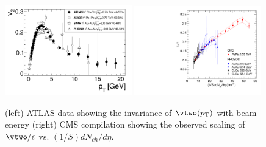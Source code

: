 \begin{figure}[!htb]
\begin{center}
\includegraphics[width=0.49\textwidth]{flowcorrelations_figs/atlas_v2_fig_06.pdf}
\includegraphics[width=0.49\textwidth]{flowcorrelations_figs/v2eps_dNdetaoverS_PHOBOS.pdf}
\caption[]{(left) ATLAS data showing the invariance of $\vtwo( \pT )$ with beam energy (right) CMS compilation showing the observed scaling of $\vtwo /\epsilon$ vs. $(1/S) dN_{ch}/d\eta$.}
\label{fig:pas:scaling}
\end{center}
\end{figure}

